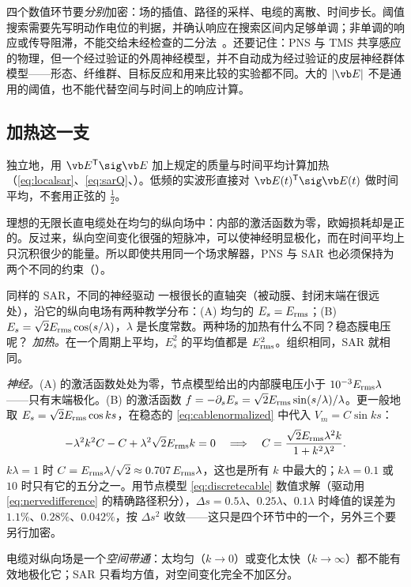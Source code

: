 四个数值环节要\emph{分别}加密：场的插值、路径的采样、电缆的离散、时间步长。阈值搜索需要先写明动作电位的判据，并确认响应在搜索区间内足够单调；非单调的响应或传导阻滞，不能交给未经检查的二分法~\cite{davids,rattay}。还要记住：PNS 与 TMS 共享感应的物理，但一个经过验证的外周神经模型，并不自动成为经过验证的皮层神经群体模型——形态、纤维群、目标反应和用来比较的实验都不同。大的 $|\vb E|$ 不是通用的阈值，也不能代替空间与时间上的响应计算。

\subsection{加热这一支}
独立地，用 $\vb E^{\mathsf T}\sig\vb E$ 加上规定的质量与时间平均计算加热（\eqref{eq:localsar}、\eqref{eq:sarQ}、）。低频的实波形直接对 $\vb E(t)^{\mathsf T}\sig\vb E(t)$ 做时间平均，不套用正弦的 $\tfrac12$。

理想的无限长直电缆处在均匀的纵向场中：内部的激活函数为零，欧姆损耗却是正的。反过来，纵向空间变化很强的短脉冲，可以使神经明显极化，而在时间平均上只沉积很少的能量。所以即使共用同一个场求解器，PNS 与 SAR 也必须保持为两个不同的约束（）。

\begin{example}[label=ex:projects-p4]{同样的 SAR，不同的神经驱动}
一根很长的直轴突（被动膜、封闭末端在很远处），沿它的纵向电场有两种教学分布：(A) 均匀的 $E_s=E_{\rm rms}$；(B) $E_s=\sqrt2E_{\rm rms}\cos(s/\lambda)$，$\lambda$ 是长度常数。两种场的加热有什么不同？稳态膜电压呢？
\solution
\emph{加热。}在一个周期上平均，$E_s^2$ 的平均值都是 $E_{\rm rms}^2$。组织相同，SAR 就相同。

\emph{神经。}(A) 的激活函数处处为零，节点模型给出的内部膜电压小于 $10^{-3}E_{\rm rms}\lambda$——只有末端极化。(B) 的激活函数 $f=-\partial_sE_s=\sqrt2E_{\rm rms}\sin(s/\lambda)/\lambda$。更一般地取 $E_s=\sqrt2E_{\rm rms}\cos ks$，在稳态的 \eqref{eq:cablenormalized} 中代入 $V_m=C\sin ks$：
\begin{equation*}
-\lambda^2k^2C-C+\lambda^2\sqrt2E_{\rm rms}k=0
\quad\Longrightarrow\quad
C=\frac{\sqrt2E_{\rm rms}\lambda^2k}{1+k^2\lambda^2}.
\end{equation*}
$k\lambda=1$ 时 $C=E_{\rm rms}\lambda/\sqrt2\approx0.707\,E_{\rm rms}\lambda$，这也是所有 $k$ 中最大的；$k\lambda=0.1$ 或 $10$ 时只有它的五分之一。用节点模型 \eqref{eq:discretecable} 数值求解（驱动用 \eqref{eq:nervedifference} 的精确路径积分），$\Delta s=0.5\lambda$、$0.25\lambda$、$0.1\lambda$ 时峰值的误差为 $1.1\%$、$0.28\%$、$0.042\%$，按 $\Delta s^2$ 收敛——这只是四个环节中的一个，另外三个要另行加密。

电缆对纵向场是一个\emph{空间带通}：太均匀（$k\to0$）或变化太快（$k\to\infty$）都不能有效地极化它；SAR 只看均方值，对空间变化完全不加区分。
\end{example}

